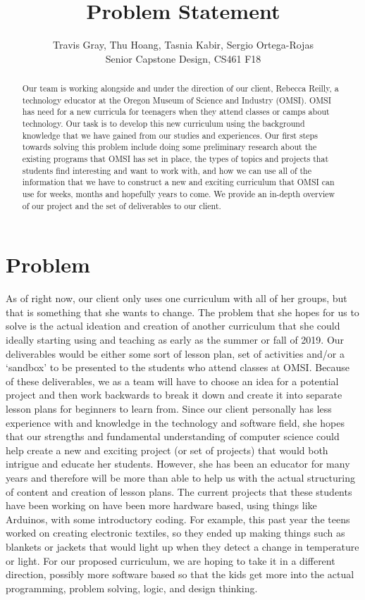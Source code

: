 \documentclass[10pt,a4paper,onecolumn,draftclsnofoot]{IEEEtran}
\author{Travis Gray, Thu Hoang, Tasnia Kabir, Sergio Ortega-Rojas\\Senior Capstone Design, CS461 F18}
\title{Problem Statement}
\date{}
\begin{document}
\maketitle
\begin{abstract}
Our team is working alongside and under the direction of our client, Rebecca Reilly, a technology educator at the Oregon Museum of Science and Industry (OMSI). OMSI has need for a new curricula for teenagers when they attend classes or camps about technology. Our task is to develop this new curriculum using the background knowledge that we have gained from our studies and experiences. Our first steps towards solving this problem include doing some preliminary research about the existing programs that OMSI has set in place, the types of topics and projects that students find interesting and want to work with, and how we can use all of the information that we have to construct a new and exciting curriculum that OMSI can use for weeks, months and hopefully years to come. We provide an in-depth overview of our project and the set of deliverables to our client.
\end{abstract}
\newpage
\section*{Problem}
As of right now, our client only uses one curriculum with all of her groups, but that is something that she wants to change. The problem that she hopes for us to solve is the actual ideation and creation of another curriculum that she could ideally starting using and teaching as early as the summer or fall of 2019. Our deliverables would be either some sort of lesson plan, set of activities and/or a ‘sandbox’ to be presented to the students who attend classes at OMSI. Because of these deliverables, we as a team will have to choose an idea for a potential project and then work backwards to break it down and create it into separate lesson plans for beginners to learn from. Since our client personally has less experience with and knowledge in the technology and software field, she hopes that our strengths and fundamental understanding of computer science could help create a new and exciting project (or set of projects) that would both intrigue and educate her students. However, she has been an educator for many years and therefore will be more than able to help us with the actual structuring of content and creation of lesson plans. The current projects that these students have been working on have been more hardware based, using things like Arduinos, with some introductory coding. For example, this past year the teens worked on creating electronic textiles, so they ended up making things such as blankets or jackets that would light up when they detect a change in temperature or light. For our proposed curriculum, we are hoping to take it in a different direction, possibly more software based so that the kids get more into the actual programming, problem solving, logic, and design thinking.
\end{document}

